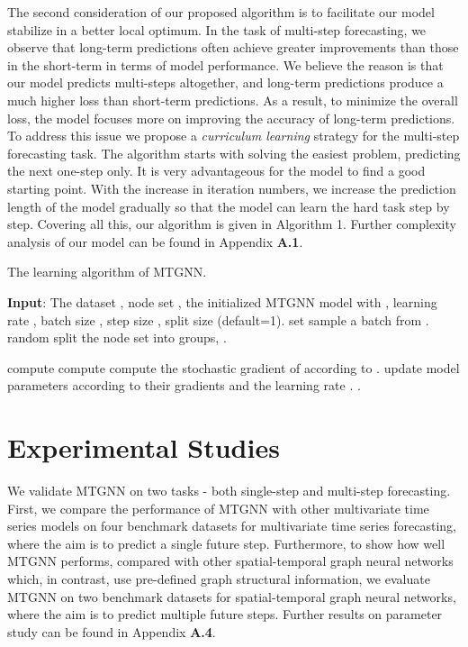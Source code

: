 \documentclass[sigconf]{acmart}
\begin{document}
The second consideration of our proposed algorithm is to facilitate our model stabilize in a better local optimum. In the task of multi-step forecasting, we observe that long-term predictions often achieve greater improvements than those in the short-term in terms of model performance. We believe the reason is that our model predicts multi-steps altogether, and long-term predictions produce a much higher loss than short-term predictions. As a result, to minimize the overall loss, the model focuses more on improving the accuracy of long-term predictions. To address this issue we propose a \textit{curriculum learning} strategy for the multi-step forecasting task. The algorithm starts with solving the easiest problem, predicting the next one-step only. It is very advantageous for the model to find a good starting point. With the increase in iteration numbers, we increase the prediction length of the model gradually so that the model can learn the hard task step by step.
Covering all this, our algorithm is given in Algorithm 1.  Further complexity analysis of our model can be found in Appendix \textbf{A.1}.


\begin{algorithm}[t]
\caption{The learning algorithm of MTGNN.}\label{alg}
\begin{algorithmic}[1]
\small
\State \textbf{Input}: The dataset , node set , the initialized MTGNN model  with , learning rate , batch size , step size , split size  (default=1).
\State set 
\Repeat
\State sample a batch  from .
\State random split the node set  into  groups, .
\State 
\EndIf

\State compute 
\State compute  
\State compute the stochastic gradient of  according to .
\State update model parameters  according to their gradients and the learning rate .
\EndFor
\State .
\end{algorithmic}
\end{algorithm}

\section{Experimental Studies}
We validate MTGNN on two tasks - both single-step and multi-step forecasting. First, we compare the performance of MTGNN with other multivariate time series models on four benchmark datasets for multivariate time series forecasting, where the aim is to predict a single future step.
Furthermore, to show how well MTGNN performs, compared with other spatial-temporal graph neural networks which, in contrast, use pre-defined graph structural information, we evaluate MTGNN on two benchmark datasets for spatial-temporal graph neural networks, where the aim is to predict multiple future steps. Further results on parameter study can be found in Appendix \textbf{A.4}.
\end{document}
